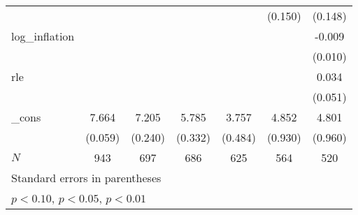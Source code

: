{\begin{tabular}{l*{6}{c}}
            &                     &                     &                     &                     &     (0.150)         &     (0.148)         \\
\addlinespace
log\_inflation&                     &                     &                     &                     &                     &      -0.009         \\
            &                     &                     &                     &                     &                     &     (0.010)         \\
\addlinespace
rle         &                     &                     &                     &                     &                     &       0.034         \\
            &                     &                     &                     &                     &                     &     (0.051)         \\
\addlinespace
\_cons      &       7.664\sym{***}&       7.205\sym{***}&       5.785\sym{***}&       3.757\sym{***}&       4.852\sym{***}&       4.801\sym{***}\\
            &     (0.059)         &     (0.240)         &     (0.332)         &     (0.484)         &     (0.930)         &     (0.960)         \\
\midrule
\(N\)       &         943         &         697         &         686         &         625         &         564         &         520         \\
\bottomrule
\multicolumn{7}{l}{\footnotesize Standard errors in parentheses}\\
\multicolumn{7}{l}{\footnotesize \sym{*} \(p<0.10\), \sym{**} \(p<0.05\), \sym{***} \(p<0.01\)}\\
\end{tabular}
}

